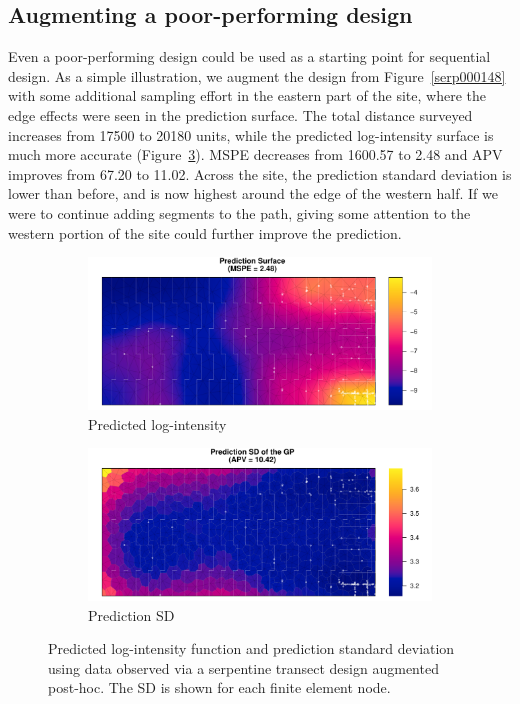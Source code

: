 \documentclass[review]{elsarticle}
\begin{document}
\subsection{Augmenting a poor-performing design}

Even a poor-performing design could be used as a starting point for sequential
design. As a simple illustration, we augment the design from
Figure~\ref{serp000148} with some additional sampling effort in the eastern
part of the site, where the edge effects were seen in the prediction surface.
The total distance surveyed increases from 17500 to 20180 units, while the
predicted log-intensity surface is much more accurate (Figure~\ref{aug}).
MSPE decreases from 1600.57 to 2.48 and APV improves from 67.20 to 11.02.
Across the site, the prediction standard deviation is lower than before, and
is now highest around the edge of the western half. If we were to continue
adding segments to the path, giving some attention to the western portion of
the site could further improve the prediction.


\begin{figure}

\begin{subfigure}{5in}
\includegraphics[width=5in]{../graphics/lambda-Aug-LGCP000004.pdf}
\caption{Predicted log-intensity}
\label{lambdaaug}
\end{subfigure}

\begin{subfigure}{5in}
\includegraphics[width=5in]{../graphics/lambdaSD-Aug-LGCP000004.pdf}
\caption{Prediction SD}
\label{sdaug}
\end{subfigure}

\caption{Predicted log-intensity function and prediction standard deviation
using data observed via a serpentine transect design augmented post-hoc. The
SD is shown for each finite element node.}
\label{aug}
\end{figure}
\end{document}
